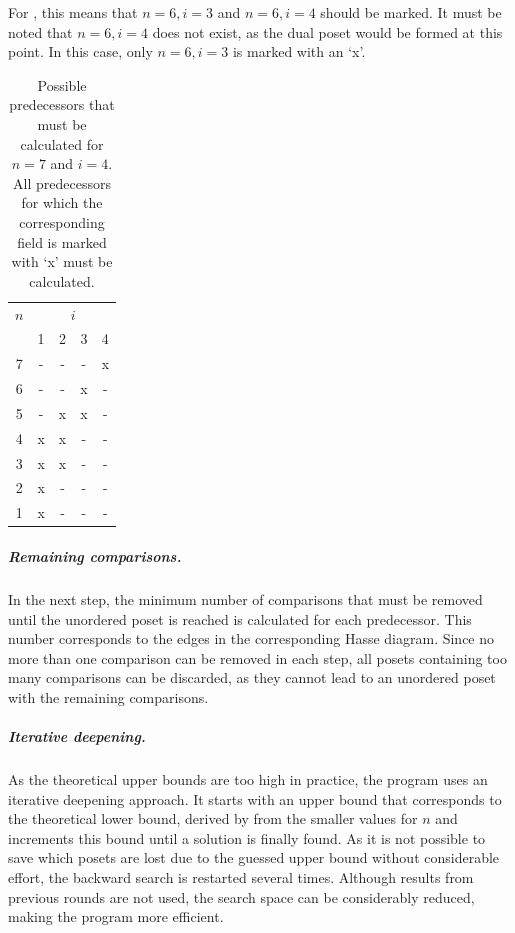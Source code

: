 \documentclass[a4paper,UKenglish,cleveref, autoref, thm-restate]{lipics-v2021}
\begin{document}
For , this means that $n = 6, i = 3$ and $n = 6, i = 4$ should be marked.
It must be noted that $n = 6, i = 4$ does not exist, as the dual poset would be formed at this point.
In this case, only $n = 6, i = 3$ is marked with an `x'.

\begin{table}[!t]
  \renewcommand{\arraystretch}{1.1}
  \caption{Possible predecessors that must be calculated for $n = 7$ and $i = 4$.
    All predecessors for which the corresponding field is marked with `x' must be calculated.}
  \label{table:n_i_values_calculated}
  \centering
  \small
  \begin{tabular}{c|cccc}
    $n$ & \multicolumn{4}{c}{$i$}             \\
        & 1                       & 2 & 3 & 4 \\ \hline
    7   & -                       & - & - & x \\
    6   & -                       & - & x & - \\
    5   & -                       & x & x & - \\
    4   & x                       & x & - & - \\
    3   & x                       & x & - & - \\
    2   & x                       & - & - & - \\
    1   & x                       & - & - & - \\
  \end{tabular}%
\end{table}

\subparagraph{Remaining comparisons.}
In the next step, the minimum number of comparisons that must be removed until the unordered poset is reached is calculated for each predecessor.
This number corresponds to the edges in the corresponding Hasse diagram.
Since no more than one comparison can be removed in each step, all posets containing too many comparisons can be discarded, as they cannot lead to an unordered poset with the remaining comparisons.


\subparagraph{Iterative deepening.}
As the theoretical upper bounds are too high in practice, the program uses an iterative deepening approach.
It starts with an upper bound that corresponds to the theoretical lower bound, derived by  from the smaller values for $n$ and increments this bound until a solution is finally found.
As it is not possible to save which posets are lost due to the guessed upper bound without considerable effort, the backward search is restarted several times.
Although results from previous rounds are not used, the search space can be considerably reduced, making the program more efficient.
\end{document}
